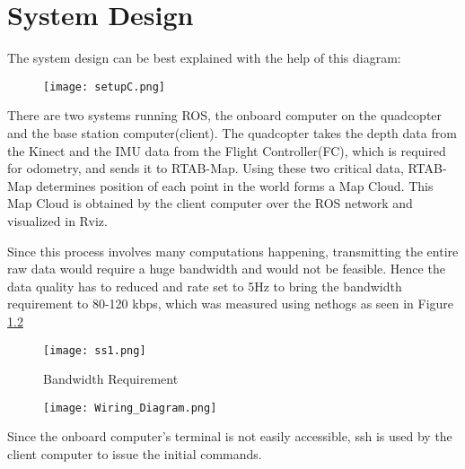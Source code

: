 \chapter{System Design}

The system design can be best explained with the help of this diagram: 

\begin{figure}[ht]
\begin{center}

\texttt{[image: setupC.png]}


\label{fig:sys_overview}
\end{center}
\end{figure}

There are two systems running ROS, the onboard computer on the quadcopter and the base station computer(client). The quadcopter takes the depth data from the Kinect and the IMU data from the Flight Controller(FC), which is required for odometry, and sends it to RTAB-Map. Using these two critical data, RTAB-Map determines position of each point in the world forms a Map Cloud. This Map Cloud is obtained by the client computer over the ROS network and visualized in Rviz. 

\hspace{20pt}

Since this process involves many computations happening, transmitting the entire raw data would require a huge bandwidth and would not be feasible. Hence the data quality has to reduced and rate set to 5Hz to bring the bandwidth requirement to 80-120 kbps, which was measured using nethogs as seen in Figure \ref{fig:bandwidth}

\begin{figure}[ht]
\begin{center}

\texttt{[image: ss1.png]}

\caption{Bandwidth Requirement}

\label{fig:bandwidth}
\end{center}
\end{figure}


\begin{figure}[ht]
\begin{center}

\texttt{[image: Wiring\_Diagram.png]}


\label{fig:wiring}
\end{center}
\end{figure}

\vspace{20pt}

Since the onboard computer's terminal is not easily accessible, ssh is used by the client computer to issue the initial commands. 


